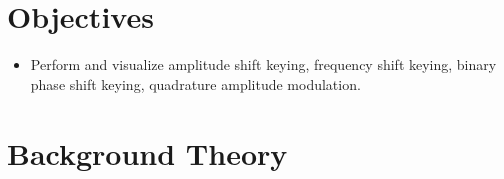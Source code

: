 \documentclass{lab_sheet}
\begin{document}
    \tableofcontents
    \clearpage
    \listoffigures
    \clearpage
    \lstlistoflistings
    \clearpage
    
\section{Objectives}
\begin{itemize}
    \item Perform and visualize amplitude shift keying, frequency shift keying, binary phase shift keying, quadrature amplitude modulation.
\end{itemize}


\section{Background Theory}
\end{document}
